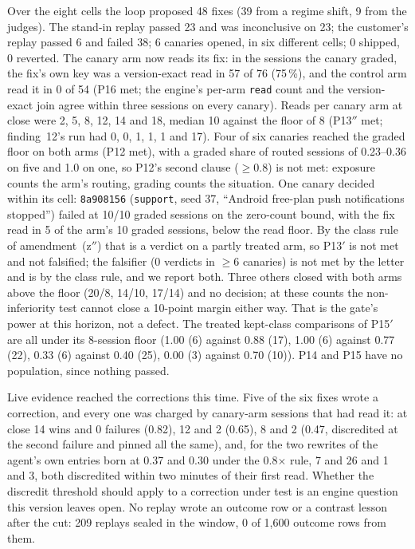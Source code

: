 \documentclass[11pt]{article}
\newcommand{\code}[1]{\texttt{#1}}
\begin{document}
Over the eight cells the loop proposed 48 fixes (39 from a regime shift, 9 from the judges). The
stand-in replay passed 23 and was inconclusive on 23; the customer's replay passed 6 and failed
38; 6 canaries opened, in six different cells; 0 shipped, 0 reverted. The canary arm now reads
its fix: in the sessions the canary graded, the fix's own key was a version-exact read in 57 of
76 (75\,\%), and the control arm read it in 0 of 54 (P16 met; the engine's per-arm \code{read}
count and the version-exact join agree within three sessions on every canary). Reads per canary
arm at close were 2, 5, 8, 12, 14 and 18, median 10 against the floor of 8 (P13$''$ met;
finding~12's run had 0, 0, 1, 1, 1 and 17). Four of six canaries reached the graded floor on
both arms (P12 met), with a graded share of routed sessions of 0.23--0.36 on five and 1.0 on
one, so P12's second clause ($\geq 0.8$) is not met: exposure counts the arm's routing, grading
counts the situation. One canary decided within its cell: \code{8a908156} (\code{support}, seed
37, ``Android free-plan push notifications stopped'') failed at 10/10 graded sessions on the
zero-count bound, with the fix read in 5 of the arm's 10 graded sessions, below the read floor.
By the class rule of amendment~(z$''$) that is a verdict on a partly treated arm, so P13$'$ is
not met and not falsified; the falsifier (0 verdicts in $\geq 6$ canaries) is not met by the
letter and is by the class rule, and we report both. Three others closed with both arms above
the floor (20/8, 14/10, 17/14) and no decision; at these counts the non-inferiority test cannot
close a 10-point margin either way. That is the gate's power at this horizon, not a defect. The
treated kept-class comparisons of P15$'$ are all under its 8-session floor (1.00 (6) against
0.88 (17), 1.00 (6) against 0.77 (22), 0.33 (6) against 0.40 (25), 0.00 (3) against 0.70 (10)).
P14 and P15 have no population, since nothing passed.

Live evidence reached the corrections this time. Five of the six fixes wrote a correction, and
every one was charged by canary-arm sessions that had read it: at close 14 wins and 0 failures
(0.82), 12 and 2 (0.65), 8 and 2 (0.47, discredited at the second failure and pinned all the
same), and, for the two rewrites of the agent's own entries born at 0.37 and 0.30 under the
0.8$\times$ rule, 7 and 26 and 1 and 3, both discredited within two minutes of their first
read. Whether the discredit threshold should apply to a correction under test is an engine
question this version leaves open. No replay wrote an outcome row or a contrast lesson after
the cut: 209 replays sealed in the window, 0 of 1,600 outcome rows from them.
\end{document}
